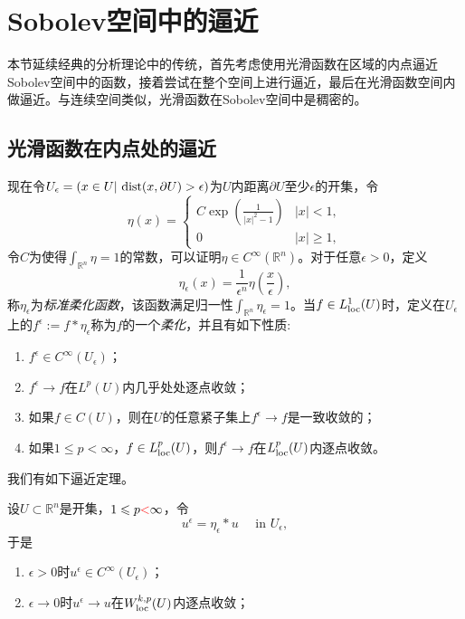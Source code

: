 \documentclass[a4paper,10pt]{ctexart}
\begin{document}
\section{Sobolev空间中的逼近}
本节延续经典的分析理论中的传统，首先考虑使用光滑函数在区域的内点逼近Sobolev空间中的函数，接着尝试在整个空间上进行逼近，最后在光滑函数空间内做逼近。与连续空间类似，光滑函数在Sobolev空间中是稠密的。
\subsection{光滑函数在内点处的逼近}
现在令$ U_\epsilon = \left( x\in U |\ {\rm dist}(x,\partial U)>\epsilon \right) $为$ U $内距离$ \partial U $至少$ \epsilon $的开集，令
\begin{equation}
    \eta(x) = \begin{cases}
        C \exp \left( \frac{1}{|x|^2-1} \right) & |x|<1,\\
        0 & |x|\geqslant 1,
    \end{cases}
\end{equation}
令$ C $为使得$ \int_{\mathbb{R}^n}\eta=1 $的常数，可以证明$ \eta\in C^\infty(\mathbb{R}^n) $。对于任意$ \epsilon>0 $，定义
\begin{equation}
    \eta_\epsilon(x) = \dfrac{1}{\epsilon^n} \eta\left( \dfrac{x}{\epsilon} \right),
\end{equation}
称$ \eta_\epsilon $为\emph{标准柔化函数}，该函数满足归一性$ \int_{\mathbb{R}^n} \eta_\epsilon = 1 $。当$ f\in L_{\rm loc}^1(U) $时，定义在$ U_\epsilon $上的$ f^\epsilon := f * \eta_\epsilon $称为$ f $的一个\emph{柔化}，并且有如下性质:
\begin{enumerate}
    \item $ f^\epsilon\in C^\infty(U_\epsilon) $；
    \item $ f^\epsilon\to f $在$ L^p(U) $内几乎处处逐点收敛；
    \item 如果$ f\in C(U) $，则在$ U $的任意紧子集上$ f^\epsilon\to f $是一致收敛的；
    \item 如果$ 1\leqslant p<\infty $，$ f\in L_{\rm loc}^p(U) $，则$ f^\epsilon\to f $在$ L^p_{\rm loc}(U) $内逐点收敛。
\end{enumerate}
我们有如下逼近定理。
\begin{theorem}
    设$ U\subset \mathbb{R}^n $是开集，$ 1\leqslant p \textcolor{red}{<} \infty $，令
    \[
        u^\epsilon = \eta_\epsilon * u \quad \text{ in } U_\epsilon,
    \]
    于是
    \begin{enumerate}
        \item $ \epsilon>0 $时$ u^\epsilon\in C^\infty(U_\epsilon) $；
        \item $ \epsilon\to 0 $时$ u^\epsilon\to u $在$ W^{k,p}_{\rm loc}(U) $内逐点收敛；
    \end{enumerate}
\end{theorem}
\end{document}

